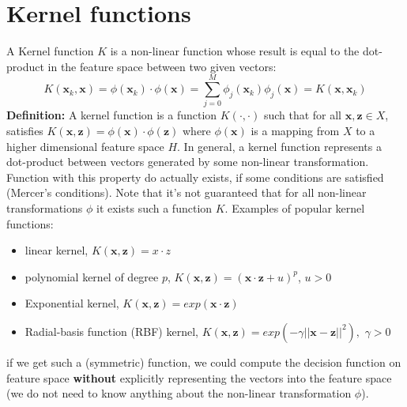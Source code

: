 \section{Kernel functions}
A Kernel function $K$ is a non-linear function whose result is equal to the dot-product in the feature space between two given vectors:
\[K(\textbf{x}_{k}, \textbf{x}) = \phi(\textbf{x}_{k}) \cdot \phi(\textbf{x}) = \sum_{j = 0}^{M} \phi_{j}(\textbf{x}_{k})\phi_{j}(\textbf{x}) = K(\textbf{x}, \textbf{x}_{k})\]
\textbf{Definition:}\newline
A kernel function is a function $K(\cdot, \cdot)$ such that for all $\textbf{x}, \textbf{z} \in X$, satisfies $K(\textbf{x}, \textbf{z}) = \phi(\textbf{x}) \cdot \phi(\textbf{z})$ where $\phi(\textbf{x})$ is a mapping from $X$ to a higher dimensional feature space $H$.\newline\newline
In general, a kernel function represents a dot-product between vectors generated by some non-linear transformation.\newline\newline
Function with this property do actually exists, if some conditions are satisfied (Mercer's conditions). Note that it's not guaranteed that for all non-linear transformations $\phi$ it exists such a function $K$.\newline\newline
Examples of popular kernel functions:
\begin{itemize}
    \item linear kernel, $K(\textbf{x},\textbf{z}) = x \cdot z$
    \item polynomial kernel of degree $p$, $K(\textbf{x},\textbf{z}) = (\textbf{x} \cdot \textbf{z} + u)^{p}$, $u > 0$
    \item Exponential kernel, $K(\textbf{x},\textbf{z}) = exp(\textbf{x} \cdot \textbf{z})$
    \item Radial-basis function (RBF) kernel, $K(\textbf{x},\textbf{z}) = exp(-\gamma ||\textbf{x} - \textbf{z}||^{2}),\,\, \gamma > 0$
\end{itemize}
if we get such a (symmetric) function, we could compute the decision function on feature space \textbf{without} explicitly representing the vectors into the feature space (we do not need to know anything about the non-linear transformation $\phi$).
